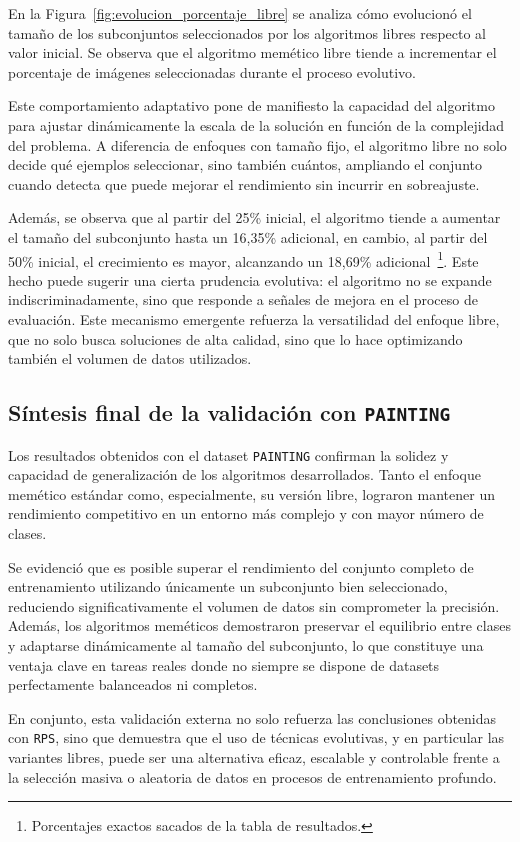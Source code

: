 En la Figura~\ref{fig:evolucion_porcentaje_libre} se analiza cómo evolucionó el tamaño de los subconjuntos seleccionados por los algoritmos libres respecto al valor inicial.
Se observa que el algoritmo memético libre tiende a incrementar el porcentaje de imágenes seleccionadas durante el proceso evolutivo.

Este comportamiento adaptativo pone de manifiesto la capacidad del algoritmo para ajustar dinámicamente la escala de la solución en función de la complejidad del problema.
A diferencia de enfoques con tamaño fijo, el algoritmo libre no solo decide qué ejemplos seleccionar, sino también cuántos,
ampliando el conjunto cuando detecta que puede mejorar el rendimiento sin incurrir en sobreajuste.

Además, se observa que al partir del 25\% inicial, el algoritmo tiende a aumentar el tamaño del subconjunto hasta un 16,35\% adicional,
en cambio, al partir del 50\% inicial, el crecimiento es mayor, alcanzando un 18,69\% adicional~\footnote{Porcentajes exactos sacados de la tabla de resultados.}.
Este hecho puede sugerir una cierta prudencia evolutiva: el algoritmo no se expande indiscriminadamente,
sino que responde a señales de mejora en el proceso de evaluación.
Este mecanismo emergente refuerza la versatilidad del enfoque libre, que no solo busca soluciones de alta calidad,
sino que lo hace optimizando también el volumen de datos utilizados.


\bigskip

\subsection*{Síntesis final de la validación con \texttt{PAINTING}}
Los resultados obtenidos con el dataset \texttt{PAINTING} confirman la solidez y capacidad de generalización de los algoritmos desarrollados.
Tanto el enfoque memético estándar como, especialmente, su versión libre, lograron mantener un rendimiento competitivo en un entorno más complejo y con mayor número de clases.

Se evidenció que es posible superar el rendimiento del conjunto completo de entrenamiento utilizando únicamente un subconjunto bien seleccionado,
reduciendo significativamente el volumen de datos sin comprometer la precisión.
Además, los algoritmos meméticos demostraron preservar el equilibrio entre clases y adaptarse dinámicamente al tamaño del subconjunto,
lo que constituye una ventaja clave en tareas reales donde no siempre se dispone de datasets perfectamente balanceados ni completos.

En conjunto, esta validación externa no solo refuerza las conclusiones obtenidas con \texttt{RPS},
sino que demuestra que el uso de técnicas evolutivas, y en particular las variantes libres, puede ser una alternativa eficaz,
escalable y controlable frente a la selección masiva o aleatoria de datos en procesos de entrenamiento profundo.
